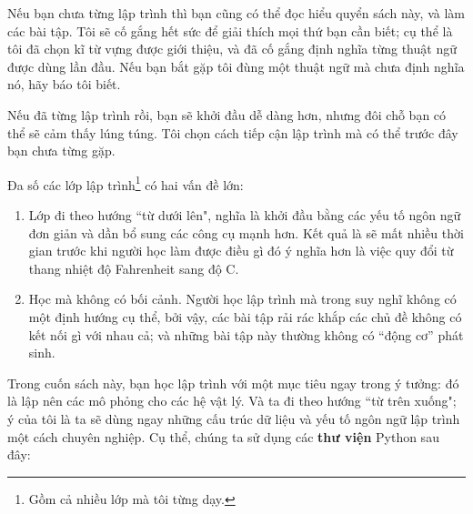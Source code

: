 \documentclass[12pt]{book}
\theoremstyle{exercise}
\begin{document}
Nếu bạn chưa từng lập trình thì bạn cũng có thể đọc hiểu quyển sách này, và làm các bài tập. Tôi sẽ cố gắng hết sức để giải thích mọi thứ bạn cần biết; cụ thể là tôi đã chọn kĩ từ vựng được giới thiệu, và đã cố gắng định nghĩa từng thuật ngữ được dùng lần đầu. Nếu bạn bắt gặp tôi đùng một thuật ngữ mà chưa định nghĩa nó, hãy báo tôi biết.

Nếu đã từng lập trình rồi, bạn sẽ khởi đầu dễ dàng hơn, nhưng đôi chỗ bạn có thể sẽ cảm thấy lúng túng. Tôi chọn cách tiếp cận lập trình mà có thể trước đây bạn chưa từng gặp.

Đa số các lớp lập trình\footnote{Gồm cả nhiều lớp mà tôi từng dạy.} có hai vấn đề lớn:

\begin{enumerate}

\item Lớp đi theo hướng ``từ dưới lên", nghĩa là khởi đầu bằng các yếu tố ngôn ngữ đơn giản và dần bổ sung các công cụ mạnh hơn. Kết quả là sẽ mất nhiều thời gian trước khi người học làm được điều gì đó ý nghĩa hơn là việc quy đổi từ thang nhiệt độ Fahrenheit sang độ C.


\item Học mà không có bối cảnh. Người học lập trình mà trong suy nghĩ không có một định hướng cụ thể, bởi vậy, các bài tập rải rác khắp các chủ đề không có kết nối gì với nhau cả; và những bài tập này thường không có ``động cơ'' phát sinh.

\end{enumerate}

Trong cuốn sách này, bạn học lập trình với một mục tiêu ngay trong ý tưởng: đó là lập nên các mô phỏng cho các hệ vật lý. Và ta đi theo hướng ``từ trên xuống"; ý của tôi là ta sẽ dùng ngay những cấu trúc dữ liệu và yếu tố ngôn ngữ lập trình một cách chuyên nghiệp. Cụ thể, chúng ta sử dụng các {\bf thư viện} Python sau đây:

\end{document}
